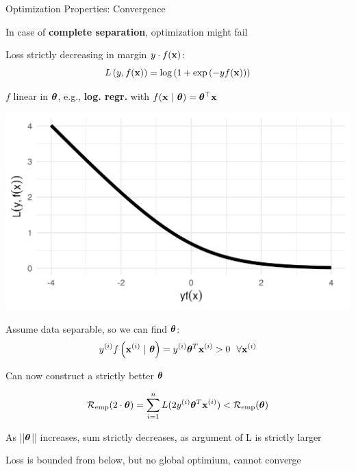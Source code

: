 \documentclass[11pt,compress,t,notes=noshow, xcolor=table]{beamer}
\begin{document}
\begin{vbframe}{Optimization Properties: Convergence}

\begin{footnotesize}

\begin{itemize}

\item In case of \textbf{complete separation}, optimization might 
fail

\begin{minipage}{0.6\textwidth}
\item Loss strictly decreasing in margin
$y \cdot f(\mathbf{x})$: 
$$L\left(y, f(\mathbf{x})\right) = \log \left( 1 + \exp \left( - y  f(\mathbf{x}) \right)\right)$$
\item $f$ linear in $\bm{\theta}$, e.g.,
\textbf{log. regr.} with $f(\mathbf{x} ~|~ \bm{\theta}) = \bm{\theta}^\top \mathbf{x}$

\end{minipage}
\begin{minipage}{0.30\textwidth}
  \includegraphics[width=\textwidth]{figure/bernoulli.png}
\end{minipage}%

\item Assume data separable, so we can find $\bm{\theta}$:
$$ y^{(i)} f\left(\mathbf{x}^{(i)} ~|~ \bm{\theta}\right) = y^{(i)} \bm{\theta}^T \mathbf{x}^{(i)} > 0 ~~ \forall \mathbf{x}^{(i)}$$

\item Can now construct a strictly better $\bm{\theta}$

$$    
\mathcal{R}_{\text{emp}}(2 \cdot \bm{\theta}) = \sum\limits_{i=1}^n L ( 2 y^{(i)} \bm{\theta}^T \mathbf{x}^{(i)}) < \mathcal{R}_{\text{emp}}(\bm{\theta})
$$

\item As ||$\bm{\theta}$|| increases, sum strictly decreases, as argument of L is strictly larger

\item Loss is bounded from below, but no global optimium, cannot converge
\end{itemize} 
\end{footnotesize}



\end{vbframe}
\end{document}
